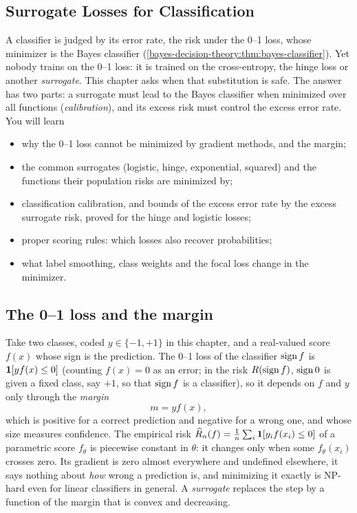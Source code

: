 \begin{notechapter}
\chapter{Surrogate Losses for Classification}\label{ch:surrogate-losses}

\begin{chapterintro}
A classifier is judged by its error rate, the risk under the 0--1 loss, whose
minimizer is the Bayes classifier (\cref{bayes-decision-theory:thm:bayes-classifier}).
Yet nobody trains on the 0--1 loss: it is trained on the cross-entropy, the hinge
loss or another \emph{surrogate}. This chapter asks when that substitution is
safe. The answer has two parts: a surrogate must lead to the Bayes classifier
when minimized over all functions (\emph{calibration}), and its excess risk must
control the excess error rate. You will learn
\begin{itemize}[nosep]
  \item why the 0--1 loss cannot be minimized by gradient methods, and the margin;
  \item the common surrogates (logistic, hinge, exponential, squared) and the
        functions their population risks are minimized by;
  \item classification calibration, and bounds of the excess error rate by the
        excess surrogate risk, proved for the hinge and logistic losses;
  \item proper scoring rules: which losses also recover probabilities;
  \item what label smoothing, class weights and the focal loss change in the
        minimizer.
\end{itemize}
\end{chapterintro}

\section{The 0--1 loss and the margin}\label{surrogate-losses:sec:margin}

Take two classes, coded $y\in\{-1, +1\}$ in this chapter, and a real-valued score $f(x)$
whose sign is the prediction. The 0--1 loss of the classifier $\operatorname{sign} f$ is
$\mathbf{1}[yf(x)\leq0]$ (counting $f(x) = 0$ as an error; in the risk $R(\operatorname{sign} f)$, $\operatorname{sign} 0$ is
given a fixed class, say $+1$, so that $\operatorname{sign} f$ is a classifier), so it depends on $f$ and $y$ only through
the \emph{margin}
\[
  m = yf(x),
\]
which is positive for a correct prediction and negative for a wrong one, and whose
size measures confidence. The empirical risk
$\widehat{R}_n(f) = \frac1n\sum_i\mathbf{1}[y_if(x_i)\leq0]$ of a parametric score $f_\theta$ is piecewise constant in $\theta$:
it changes only when some $f_\theta(x_i)$ crosses zero. Its gradient is zero almost
everywhere and undefined elsewhere, it says nothing about \emph{how} wrong a
prediction is, and minimizing it exactly is NP-hard even for linear classifiers
in general. A \emph{surrogate} replaces the step by a function of the margin that
is convex and decreasing.


\end{notechapter}
